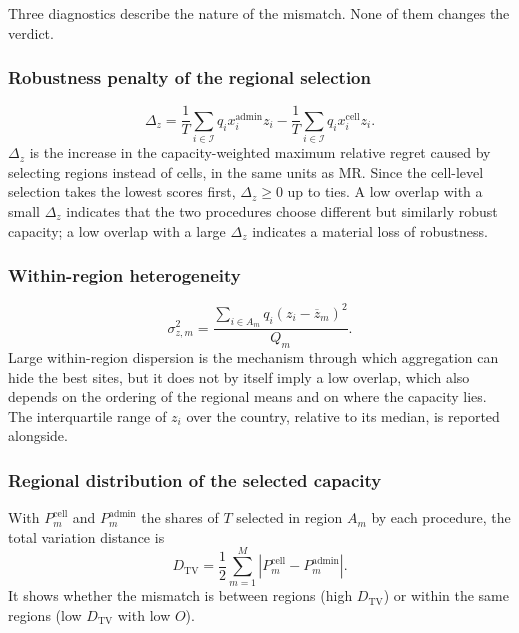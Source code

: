 Three diagnostics describe the nature of the mismatch. None of them changes the
verdict.

\subsubsection{Robustness penalty of the regional selection}

\begin{equation}
    \Delta_z=\frac{1}{T}\sum_{i\in\mathcal{I}}q_i x^{\mathrm{admin}}_i z_i
    -\frac{1}{T}\sum_{i\in\mathcal{I}}q_i x^{\mathrm{cell}}_i z_i .
    \label{eq:h2_penalty}
\end{equation}
$\Delta_z$ is the increase in the capacity-weighted maximum relative regret
caused by selecting regions instead of cells, in the same units as
$\mathrm{MR}$. Since the cell-level selection takes the lowest scores first,
$\Delta_z\geq 0$ up to ties. A low overlap with a small $\Delta_z$ indicates
that the two procedures choose different but similarly robust capacity; a low
overlap with a large $\Delta_z$ indicates a material loss of robustness.

\subsubsection{Within-region heterogeneity}

\begin{equation}
    \sigma^{2}_{z,m}=\frac{\sum_{i\in A_m}q_i\left(z_i-\overline{z}_m\right)^{2}}{Q_m}.
    \label{eq:h2_within_variance}
\end{equation}
Large within-region dispersion is the mechanism through which aggregation can
hide the best sites, but it does not by itself imply a low overlap, which also
depends on the ordering of the regional means and on where the capacity lies.
The interquartile range of $z_i$ over the country, relative to its median, is
reported alongside.

\subsubsection{Regional distribution of the selected capacity}

With $P^{\mathrm{cell}}_m$ and $P^{\mathrm{admin}}_m$ the shares of $T$ selected
in region $A_m$ by each procedure, the total variation distance is
\begin{equation}
    D_{\mathrm{TV}}=\frac{1}{2}\sum_{m=1}^{M}
    \left|P^{\mathrm{cell}}_m-P^{\mathrm{admin}}_m\right| .
    \label{eq:h2_tv}
\end{equation}
It shows whether the mismatch is between regions (high $D_{\mathrm{TV}}$) or
within the same regions (low $D_{\mathrm{TV}}$ with low $O$).

